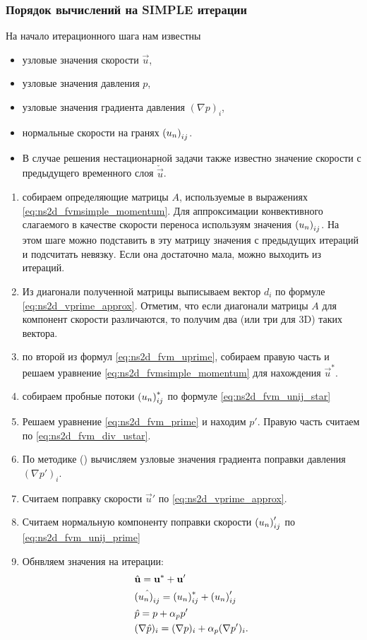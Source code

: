 \subsubsection{Порядок вычислений на SIMPLE итерации}
\label{sec:fvm_simple_steps}
На начало итерационного шага нам известны
\begin{itemize}
\item узловые значения скорости $\vec u$,
\item узловые значения давления $p$,
\item узловые значения градиента давления $(\nabla p)_i$,
\item нормальные скорости на гранях $\left(u_n\right)_{ij}$.
\item
В случае решения нестационарной задачи также известно
значение скорости с предыдущего временного слоя $\check{\vec u}$.
\end{itemize}
\begin{enumerate}
\item собираем определяющие матрицы $A$, используемые в выражениях \cref{eq:ns2d_fvmsimple_momentum}.
Для аппроксимации конвективного слагаемого в качестве скорости переноса используям значения $\left(u_n\right)_{ij}$.
На этом шаге можно подставить в эту матрицу значения с предыдущих итераций и подсчитать невязку.
Если она достаточно мала, можно выходить из итераций.
\item Из диагонали полученной матрицы выписываем вектор $d_i$ по формуле \cref{eq:ns2d_vprime_approx}.
      Отметим, что если диагонали матрицы $A$ для компонент скорости различаются, то получим два (или три для 3D)
      таких вектора.
\item по второй из формул \cref{eq:ns2d_fvm_uprime},
      собираем правую часть и решаем уравнение \cref{eq:ns2d_fvmsimple_momentum} для нахождения $\vec u^*$.
\item собираем пробные потоки $\left(u_n\right)_{ij}^*$ по формуле \cref{eq:ns2d_fvm_unij_star}
\item Решаем уравнение \cref{eq:ns2d_fvm_prime} и находим $p'$. Правую часть считаем по \cref{eq:ns2d_fvm_div_ustar}.
\item По методике () вычисляем узловые значения градиента поправки давления $\left(\nabla p'\right)_i$.
\item Считаем поправку скорости $\vec u'$ по \cref{eq:ns2d_vprime_approx}.
\item Считаем нормальную компоненту поправки скорости $\left(u_n\right)_{ij}'$ по \cref{eq:ns2d_fvm_unij_prime}
\item Обнвляем значения на итерации:
\begin{align*}
&\hat{\boldsymbol{\rm u}} = \boldsymbol{\rm u}^* + \boldsymbol{\rm u}' \\
&\hat{\left(u_n\right)_{ij}} = \left(u_n\right)_{ij}^* + \left(u_n\right)_{ij}'\\
&\hat p = p + \alpha_p p' \\
&(\nabla \hat p)_i = (\nabla p)_i + \alpha_p (\nabla p')_i.
\end{align*}
\end{enumerate}

